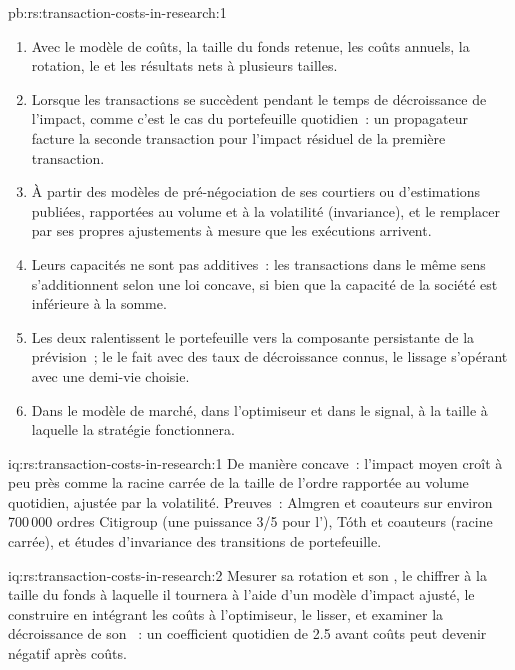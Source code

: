 \begin{solution}{pb:rs:transaction-costs-in-research:1}
\begin{enumerate}
\item Avec le modèle de coûts, la taille du fonds retenue, les coûts annuels, la rotation, le  et les résultats nets à plusieurs tailles.
\item Lorsque les transactions se succèdent pendant le temps de décroissance de l'impact, comme c'est le cas du portefeuille quotidien~: un propagateur facture la seconde transaction pour
l'impact résiduel de la première transaction.
\item À partir des modèles de pré-négociation de ses courtiers ou d'estimations publiées, rapportées au volume et à la volatilité (invariance), et le remplacer par ses propres ajustements à mesure que les exécutions arrivent.
\item Leurs capacités ne sont pas additives~: les transactions dans le même sens s'additionnent selon une loi concave, si bien que la capacité de la société est inférieure à la somme.
\item Les deux ralentissent le portefeuille vers la composante persistante de la prévision~; le  le fait avec des taux de décroissance connus, le lissage s'opérant avec une demi-vie choisie.
\item Dans le modèle de marché, dans l'optimiseur et dans le signal, à la taille à laquelle la stratégie fonctionnera.
\end{enumerate}
\end{solution}

\begin{solution}{iq:rs:transaction-costs-in-research:1}
De manière concave~: l'impact moyen croît à peu près comme la racine carrée de la taille de l'ordre rapportée au volume quotidien, ajustée par la volatilité. Preuves~: Almgren et coauteurs sur
environ 700\,000 ordres Citigroup (une puissance 3/5 pour l'), Tóth et coauteurs (racine carrée), et études d'invariance des transitions de portefeuille.
\end{solution}

\begin{solution}{iq:rs:transaction-costs-in-research:2}
Mesurer sa rotation et son , le chiffrer à la taille du fonds à laquelle il tournera à l'aide d'un modèle d'impact ajusté, le construire en intégrant les coûts à l'optimiseur, le lisser,
et examiner la décroissance de son ~: un coefficient quotidien de 2.5 avant coûts peut devenir négatif après coûts.
\end{solution}

